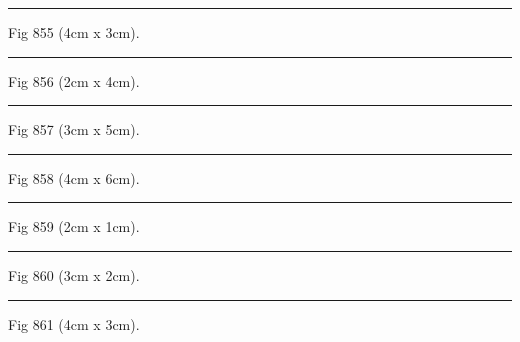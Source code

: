 \documentclass[a4paper,11pt]{article}
\begin{document}
\begin{swarmwrap}%
  \begin{minipage}[t]{4cm}
    \centering
    \rule{\linewidth}{3cm}
    {\footnotesize Fig 855 (4cm x 3cm).}
  \end{minipage}%
\end{swarmwrap}%
\swarmwrapnext
\lipsum[105]%

\begin{swarmwrap}%
  \begin{minipage}[t]{2cm}
    \centering
    \rule{\linewidth}{4cm}
    {\footnotesize Fig 856 (2cm x 4cm).}
  \end{minipage}%
\end{swarmwrap}%
\swarmwrapnext
\lipsum[106]%

\begin{swarmwrap}%
  \begin{minipage}[t]{3cm}
    \centering
    \rule{\linewidth}{5cm}
    {\footnotesize Fig 857 (3cm x 5cm).}
  \end{minipage}%
\end{swarmwrap}%
\swarmwrapnext
\lipsum[107]%

\begin{swarmwrap}%
  \begin{minipage}[t]{4cm}
    \centering
    \rule{\linewidth}{6cm}
    {\footnotesize Fig 858 (4cm x 6cm).}
  \end{minipage}%
\end{swarmwrap}%
\swarmwrapnext
\lipsum[108]%

\begin{swarmwrap}%
  \begin{minipage}[t]{2cm}
    \centering
    \rule{\linewidth}{1cm}
    {\footnotesize Fig 859 (2cm x 1cm).}
  \end{minipage}%
\end{swarmwrap}%
\swarmwrapnext
\lipsum[109]%

\begin{swarmwrap}%
  \begin{minipage}[t]{3cm}
    \centering
    \rule{\linewidth}{2cm}
    {\footnotesize Fig 860 (3cm x 2cm).}
  \end{minipage}%
\end{swarmwrap}%
\swarmwrapnext
\lipsum[110]%

\begin{swarmwrap}%
  \begin{minipage}[t]{4cm}
    \centering
    \rule{\linewidth}{3cm}
    {\footnotesize Fig 861 (4cm x 3cm).}
  \end{minipage}%
\end{swarmwrap}%
\swarmwrapnext
\lipsum[111]%
\end{document}
